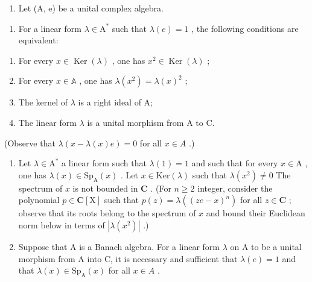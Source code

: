 
\begin{enumerate}
\def\labelenumi{\arabic{enumi})}
\tightlist
\item
  Let (A, e) be a unital complex algebra.
\end{enumerate}

\begin{enumerate}
\def\labelenumi{\alph{enumi})}
\tightlist
\item
  For a linear form \(\lambda \in \mathrm{A}^*\) such that \(\lambda(e) = 1\) , the following conditions are equivalent:
\end{enumerate}

\begin{enumerate}
\def\labelenumi{(\roman{enumi})}
\item
  For every \(x \in \operatorname{Ker}(\lambda)\) , one has \(x^2 \in \operatorname{Ker}(\lambda)\) ;
\item
  For every \(x \in \mathbb{A}\) , one has \(\lambda(x^{2}) = \lambda(x)^{2}\) ;
\item
  The kernel of \(\lambda\) is a right ideal of A;
\item
  The linear form \(\lambda\) is a unital morphism from A to C.
\end{enumerate}

(Observe that \(\lambda(x - \lambda(x)e) = 0\) for all \(x\in A\) .)

\begin{enumerate}
\def\labelenumi{\alph{enumi})}
\setcounter{enumi}{1}
\item
  Let \(\lambda \in \mathrm{A}^*\) a linear form such that \(\lambda(1) = 1\) and such that for every \(x \in \mathrm{A}\) , one has \(\lambda(x) \in \mathrm{Sp}_{\mathrm{A}}(x)\) . Let \(x \in \mathrm{Ker}(\lambda)\) such that \(\lambda(x^{2}) \neq 0\) The spectrum of \(x\) is not bounded in \(\mathbf{C}\) . (For \(n \geqslant 2\) integer, consider the polynomial \(p \in \mathbf{C}[\mathrm{X}]\) such that \(p(z) = \lambda((ze - x)^{n})\) for all \(z \in \mathbf{C}\) ; observe that its roots belong to the spectrum of \(x\) and bound their Euclidean norm below in terms of \(|\lambda(x^{2})|\) .)
\item
  Suppose that A is a Banach algebra. For a linear form \(\lambda\) on A to be a unital morphism from A into C, it is necessary and sufficient that \(\lambda(e)=1\) and that \(\lambda(x)\in\mathrm{Sp}_{\mathrm{A}}(x)\) for all \(x\in A\) .
\end{enumerate}

